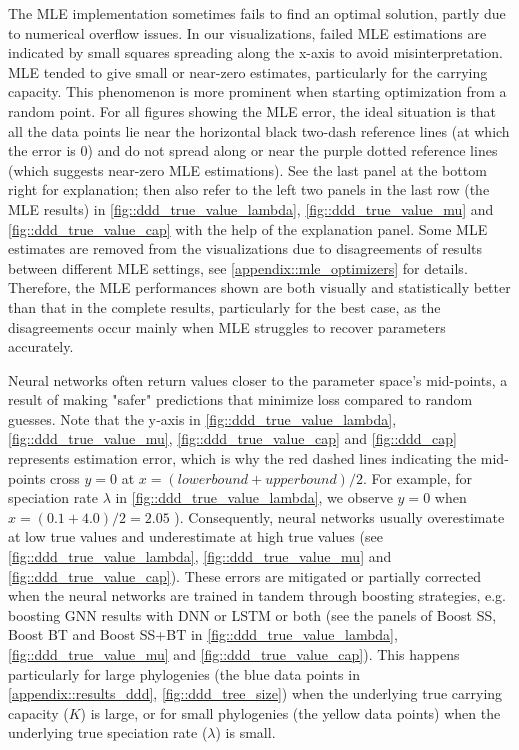{The MLE implementation sometimes fails to find an optimal solution, partly due to numerical overflow issues. In our visualizations, failed MLE estimations are indicated by small squares spreading along the x-axis to avoid misinterpretation. MLE tended to give small or near-zero estimates, particularly for the carrying capacity. This phenomenon is more prominent when starting optimization from a random point. For all figures showing the MLE error, the ideal situation is that all the data points lie near the horizontal black two-dash reference lines (at which the error is 0) and do not spread along or near the purple dotted reference lines (which suggests near-zero MLE estimations). See the last panel at the bottom right for explanation; then also refer to the left two panels in the last row (the MLE results) in \autoref{fig::ddd_true_value_lambda}, \autoref{fig::ddd_true_value_mu} and \autoref{fig::ddd_true_value_cap} with the help of the explanation panel. Some MLE estimates are removed from the visualizations due to disagreements of results between different MLE settings, see \autoref{appendix::mle_optimizers} for details. Therefore, the MLE performances shown are both visually and statistically better than that in the complete results, particularly for the best case, as the disagreements occur mainly when MLE struggles to recover parameters accurately.

Neural networks often return values closer to the parameter space's mid-points, a result of making "safer" predictions that minimize loss compared to random guesses. Note that the y‑axis in \autoref{fig::ddd_true_value_lambda}, \autoref{fig::ddd_true_value_mu}, \autoref{fig::ddd_true_value_cap} and \autoref{fig::ddd_cap} represents estimation error, which is why the red dashed lines indicating the mid-points cross $y = 0$ at $x = (lower bound + upper bound)/2$. For example, for speciation rate $\lambda$ in \autoref{fig::ddd_true_value_lambda}, we observe $y = 0$ when $x = (0.1 + 4.0) / 2 = 2.05$ ). Consequently, neural networks usually overestimate at low true values and underestimate at high true values  (see \autoref{fig::ddd_true_value_lambda}, \autoref{fig::ddd_true_value_mu} and \autoref{fig::ddd_true_value_cap}). These errors are mitigated or partially corrected when the neural networks are trained in tandem through boosting strategies, e.g. boosting GNN results with DNN or LSTM or both (see the panels of Boost SS, Boost BT and Boost SS+BT in \autoref{fig::ddd_true_value_lambda}, \autoref{fig::ddd_true_value_mu} and \autoref{fig::ddd_true_value_cap}). This happens particularly for large phylogenies (the blue data points in \autoref{appendix::results_ddd}, \autoref{fig::ddd_tree_size}) when the underlying true carrying capacity ($K$) is large, or for small phylogenies (the yellow data points) when the underlying true speciation rate ($\lambda$) is small. 

}
